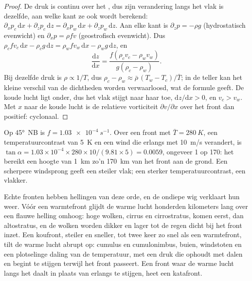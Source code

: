 \begin{proof}
De druk is continu over het , dus zijn verandering langs het vlak is
dezelfde, aan welke kant ze ook wordt berekend: $\partial_x p_c\,\mathrm{d}x + \partial_z p_c\,\mathrm{d}z =
\partial_x p_w\,\mathrm{d}x + \partial_z p_w\,\mathrm{d}z$. Aan elke kant is $\partial_z p = -\rho g$
(hydrostatisch evenwicht) en $\partial_x p = \rho f v$ (geostrofisch evenwicht). Dus
$\rho_c f v_c\,\mathrm{d}x - \rho_c g\,\mathrm{d}z = \rho_w f v_w\,\mathrm{d}x - \rho_w
g\,\mathrm{d}z$, en
\[
  \frac{\mathrm{d}z}{\mathrm{d}x} = \frac{f(\rho_c v_c - \rho_w v_w)}{g(\rho_c - \rho_w)} .
\]
Bij dezelfde druk is $\rho \propto 1/T$, dus $\rho_c - \rho_w \approx \bar\rho\,(T_w -
T_c)/\bar T$; in de teller kan het kleine verschil van de dichtheden worden verwaarloosd, wat
de formule geeft. De koude lucht ligt onder, dus het vlak stijgt naar haar toe, $\mathrm{d}z/
\mathrm{d}x > 0$, en $v_c > v_w$. Met $x$ naar de koude lucht is de relatieve vorticiteit
$\partial v/\partial x$ over het front dan positief: cyclonaal.
\end{proof}

\begin{example}\label{ex:b2:weather-systems:slope}
Op \ang{45}~NB is $f = \qty{1.03e-4}{s^{-1}}$. Over een front met $\bar T = \qty{280}{K}$, een
temperatuurcontrast van \qty{5}{K} en een wind die erlangs met \qty{10}{m/s} verandert, is $\tan\alpha
= 1.03 \times 10^{-4} \times 280 \times 10/(9.81 \times 5) = 0.0059$, ongeveer 1 op 170: het
 bereikt een hoogte van \qty{1}{km} zo'n \qty{170}{km} van het front aan de grond.
Een scherpere windsprong geeft een steiler vlak; een sterker temperatuurcontrast, een vlakker.
\end{example}

Echte fronten hebben hellingen van deze orde, en de ondiepe wig verklaart hun weer. Vóór een
warmtefront glijdt de warme lucht honderden kilometers lang over een flauwe helling omhoog: hoge wolken,
cirrus en cirrostratus, komen eerst, dan altostratus, en de wolken worden dikker en lager tot
de regen dicht bij het front inzet. Een koufront, steiler en sneller, tot twee keer zo snel als een
warmtefront, tilt de warme lucht abrupt op: cumulus en cumulonimbus, buien, windstoten en een plotselinge daling
van de temperatuur, met een druk die ophoudt met dalen en begint te stijgen terwijl het front passeert. Een front
waar de warme lucht langs het  daalt in plaats van erlangs te stijgen, heet een katafront.

